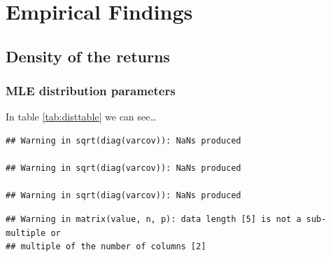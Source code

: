 \documentclass[a4paper,nobind]{templates/ociamthesis}
\begin{document}
\setlength{\textbaselineskip}{22pt plus2pt}

\setlength{\parskip}{2pt plus 1pt}

\setlength{\baselineskip}{\textbaselineskip}

\hypertarget{analysis}{%
\chapter{Empirical Findings}\label{analysis}}

\minitoc 

\hypertarget{density-of-the-returns}{%
\section{Density of the returns}\label{density-of-the-returns}}

\hypertarget{mle-distribution-parameters}{%
\subsection{MLE distribution parameters}\label{mle-distribution-parameters}}

In table \ref{tab:disttable} we can see\ldots{}

\begin{verbatim}
## Warning in sqrt(diag(varcov)): NaNs produced

## Warning in sqrt(diag(varcov)): NaNs produced

## Warning in sqrt(diag(varcov)): NaNs produced
\end{verbatim}

\begin{verbatim}
## Warning in matrix(value, n, p): data length [5] is not a sub-multiple or
## multiple of the number of columns [2]
\end{verbatim}
\end{document}
